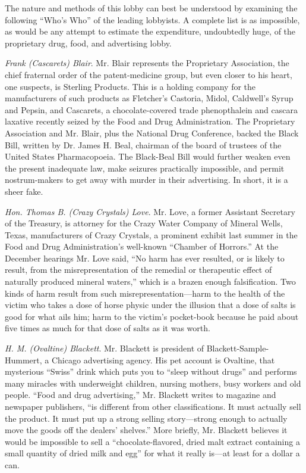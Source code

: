 \documentclass[nohyper,openany,nobib]{tufte-book}
\begin{document}
The nature and methods of this lobby can best be understood by examining
the following ``Who's Who'' of the leading lobbyists. A complete list is
as impossible, as would be any attempt to estimate the expenditure,
undoubtedly huge, of the proprietary drug, food, and advertising lobby.

\emph{Frank (Cascarets) Blair}. Mr. Blair represents the Proprietary
Association, the chief fraternal order of the patent-medicine group, but
even closer to his heart, one suspects, is Sterling Products. This is a
holding company for the manufacturers of such products as Fletcher's
Castoria, Midol, Caldwell's Syrup and Pepsin, and Cascarets, a
chocolate-covered trade phenopthalein and cascara laxative recently
seized by the Food and Drug Administration. The Proprietary Association
and Mr. Blair, plus the National Drug Conference, backed the Black Bill,
written by Dr. James H. Beal, chairman of the board of trustees of the
United States Pharmacopoeia. The Black-Beal Bill would further weaken
even the present inadequate law, make seizures practically impossible,
and permit nostrum-makers to get away with murder in their advertising.
In short, it is a sheer fake.

\emph{Hon. Thomas B. (Crazy Crystals) Love}. Mr. Love, a former
Assistant Secretary of the Treasury, is attorney for the Crazy Water
Company of Mineral Wells, Texas, manufacturers of Crazy Crystals, a
prominent exhibit last summer in the Food and Drug Administration's
well-known ``Chamber of Horrors.'' At the December hearings Mr. Love
said, ``No harm has ever resulted, or is likely to result, from the
misrepresentation of the remedial or therapeutic effect of naturally
produced mineral waters,'' which is a brazen enough falsification. Two
kinds of harm result from such misrepresentation---harm to the health of
the victim who takes a dose of horse physic under the illusion that a
dose of salts is good for what ails him; harm to the victim's
pocket-book because he paid about five times as much for that dose of
salts as it was worth.

\emph{H. M. (Ovaltine) Blackett}. Mr. Blackett is president of
Blackett-Sample-Hummert, a Chicago advertising agency. His pet account
is Ovaltine, that mysterious ``Swiss'' drink which puts you to ``sleep
without drugs'' and performs many miracles with underweight children,
nursing mothers, busy workers and old people. ``Food and drug
advertising,'' Mr. Blackett writes to magazine and newspaper publishers,
``is different from other classifications. It must actually sell the
product. It must put up a strong selling story---strong enough to
actually move the goods off the dealers' shelves.'' More briefly, Mr.
Blackett believes it would be impossible to sell a ``chocolate-flavored,
dried malt extract containing a small quantity of dried milk and egg''
for what it really is---at least for a dollar a can.
\end{document}
